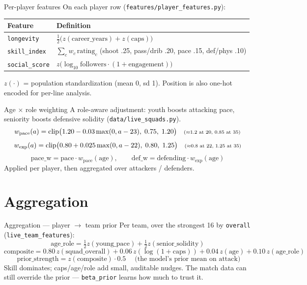 \documentclass[aspectratio=169]{beamer}
\begin{document}
\begin{frame}{Per-player features}
On each player row (\texttt{features/player\_features.py}):
\centering
\begin{tabular}{@{}ll@{}}
\toprule
Feature & Definition \\
\midrule
\texttt{longevity}    & $\tfrac{1}{2}\big(z(\text{career\_years}) + z(\text{caps})\big)$ \\[2pt]
\texttt{skill\_index} & $\sum_c w_c\,\text{rating}_c$ \; (shoot .25, pass/drib .20, pace .15, def/phys .10) \\[2pt]
\texttt{social\_score}& $z\!\big(\log_{10}\text{followers}\cdot(1+\text{engagement})\big)$ \\
\bottomrule
\end{tabular}
\vspace{0.8em}
\footnotesize $z(\cdot)$ = population standardization (mean 0, sd 1). Position
is also one-hot encoded for per-line analysis.
\end{frame}

\begin{frame}{Age $\times$ role weighting}
A role-aware adjustment: youth boosts attacking pace, seniority boosts
defensive solidity (\texttt{data/live\_squads.py}).
\[
w_{\text{pace}}(a) = \mathrm{clip}\big(1.20 - 0.03\max(0,a-23),\;0.75,\;1.20\big)
\quad\text{\scriptsize ($\approx$1.2 at 20, 0.85 at 35)}
\]
\[
w_{\text{exp}}(a) = \mathrm{clip}\big(0.80 + 0.025\max(0,a-22),\;0.80,\;1.25\big)
\quad\text{\scriptsize ($\approx$0.8 at 22, 1.25 at 35)}
\]
\[
\text{pace\_w} = \text{pace}\cdot w_{\text{pace}}(\text{age}),\qquad
\text{def\_w} = \text{defending}\cdot w_{\text{exp}}(\text{age})
\]
\footnotesize Applied per player, then aggregated over attackers / defenders.
\end{frame}

\section{Aggregation}

\begin{frame}{Aggregation --- player $\to$ team prior}
Per team, over the strongest 16 by \texttt{overall}
(\texttt{live\_team\_features}):
\[
\text{age\_role} = \tfrac12 z(\text{young\_pace}) + \tfrac12 z(\text{senior\_solidity})
\]
\[
\text{composite} = 0.80\,z(\text{squad\_overall}) + 0.06\,z(\log(1{+}\text{caps}))
                 + 0.04\,z(\text{age}) + 0.10\,z(\text{age\_role})
\]
\[
\boxed{\;\text{prior\_strength} = z(\text{composite})\cdot 0.5\;}\quad\text{(the model's prior mean on attack)}
\]
\footnotesize Skill dominates; caps/age/role add small, auditable nudges. The
match data can still override the prior --- \texttt{beta\_prior} learns how much
to trust it.
\end{frame}
\end{document}
